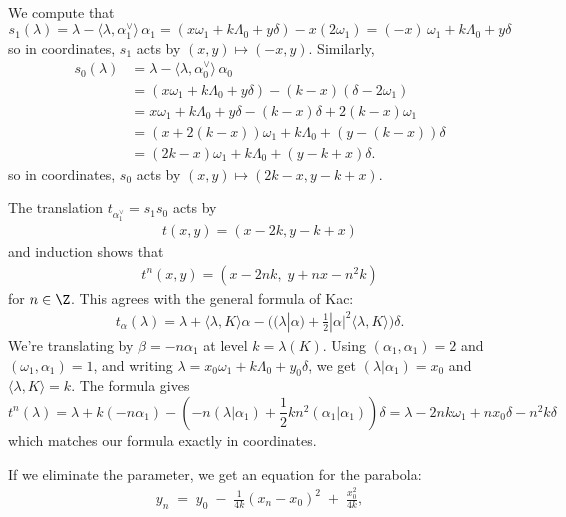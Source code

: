 \documentclass[12pt]{article}
\begin{document}
We compute that
\[s_1(\lambda) = \lambda - \langle \lambda, \alpha_1^\vee\rangle\, \alpha_1
    = (x\omega_1 + k\Lambda_0 + y\delta) - x(2\omega_1)
    = (-x)\,\omega_1 + k\Lambda_0 + y\delta\] so in coordinates, $s_1$ acts by $(x,y) \mapsto (-x,y)$. Similarly,
\[\begin{aligned}
        s_0(\lambda) & = \lambda - \langle \lambda, \alpha_0^\vee\rangle\, \alpha_0      \\
                     & = (x\omega_1 + k\Lambda_0 + y\delta) - (k-x)(\delta - 2\omega_1)  \\
                     & = x\omega_1 + k\Lambda_0 + y\delta - (k-x)\delta + 2(k-x)\omega_1 \\
                     & = (x + 2(k - x))\omega_1 + k\Lambda_0 + (y - (k - x))\delta       \\
                     & = (2k - x)\omega_1 + k\Lambda_0 + (y - k + x)\delta.
    \end{aligned}\]
so in coordinates, $s_0$ acts by $(x,y) \mapsto (2k - x, y - k + x)$.

The translation $t_{\alpha_1^\vee} = s_1s_0$ acts by \begin{align*}
    t(x,y)=(x-2k,y-k+x)
\end{align*} and induction shows that \begin{align*}
    t^n(x,y) = (x - 2nk, \; y + n x - n^2 k)
\end{align*} for $n \in \Z$. This agrees with the general formula of Kac:
\begin{align*}
    t_\alpha(\lambda)
    = \lambda + \langle \lambda, K \rangle \alpha
    - \big( (\lambda|\alpha)
    + \tfrac{1}{2}|\alpha|^2 \langle \lambda, K \rangle \big)\delta.
\end{align*}
We're translating by $\beta=-n\alpha_1$ at level $k=\lambda(K)$. Using $(\alpha_1,\alpha_1)=2$ and $(\omega_1,\alpha_1)=1$, and writing $\lambda = x_0\omega_1 + k\Lambda_0 + y_0\delta$, we get $(\lambda|\alpha_1)=x_0$ and $\langle \lambda,K\rangle = k$. The formula gives \[t^n(\lambda) = \lambda + k(-n\alpha_1) - ( -n(\lambda|\alpha_1) + \frac{1}{2} kn^2(\alpha_1|\alpha_1))\delta = \lambda - 2nk\omega_1 + nx_0\delta - n^2k\delta\] which matches our formula exactly in coordinates.

If we eliminate the parameter, we get an equation for the parabola:
\begin{align*}
    y_n \;=\; y_0 \;-\;\frac{1}{4k}(x_n - x_0)^2 \;+\; \frac{x_0^2}{4k},
\end{align*}
\end{document}
